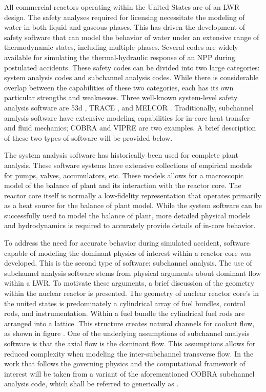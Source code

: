All commercial reactors operating within the United States are of an LWR design.
The safety analyses required for licensing necessitate the modeling of water in both liquid and gaseous phases.
This has driven the development of safety software that can model the behavior of water under an extensive range of thermodynamic states, including multiple phases.
Several codes are widely available for simulating the thermal-hydraulic response of an NPP during postulated accidents.
These safety codes can be divided into two large categories: system analysis codes and subchannel analysis codes.
While there is considerable overlap between the capabilities of these two categories, each has its own particular strengths and weaknesses.
Three well-known system-level safety analysis software are \relap53d{} \cite{RELAP}, TRACE \cite{TRACE}, and MELCOR \cite{Summers1994}.
Traditionally, subchannel analysis software have extensive modeling capabilities for in-core heat transfer and fluid mechanics; COBRA \cite{Thurgood1983c} and VIPRE are two examples.
A brief description of these two types of software will be provided below.

The system analysis software has historically been used for complete plant analysis.
These software systems have extensive collections of empirical models for pumps, valves, accumulators, etc.
These models allows for a macroscopic model of the balance of plant and its interaction with the
reactor core.
The reactor core itself is normally a low-fidelity representation that operates primarily as a heat source for the balance of plant model.
While the system software can be successfully used to model the balance of plant, more detailed physical models and hydrodynamics is required to accurately provide details of in-core behavior.

To address the need for accurate behavior during simulated accident, software capable of modeling the dominant physics of interest within a reactor core was developed.
This is the second type of software: subchannel analysis.
The use of subchannel analysis software stems from physical arguments about dominant flow within a LWR.
To motivate these arguments, a brief discussion of the geometry within the nuclear reactor is presented.
The geometry of nuclear reactor core's in the united states is predominately a cylindrical array of fuel bundles, control rods, and instrumentation.
Within a fuel bundle the cylindrical fuel rods are arranged into a lattice.
This structure creates natural channels for coolant flow, as shown in figure .
One of the underlying assumptions of subchannel analysis software is that the axial flow is the dominant flow.
This assumptions allows for reduced complexity when modeling the inter-subchannel transverse flow.
In the work that follows the governing physics and the computational framework of interest will be taken from a variant of the aforementioned COBRA subchannel analysis code, which shall be referred to generically as \cobra{}.

